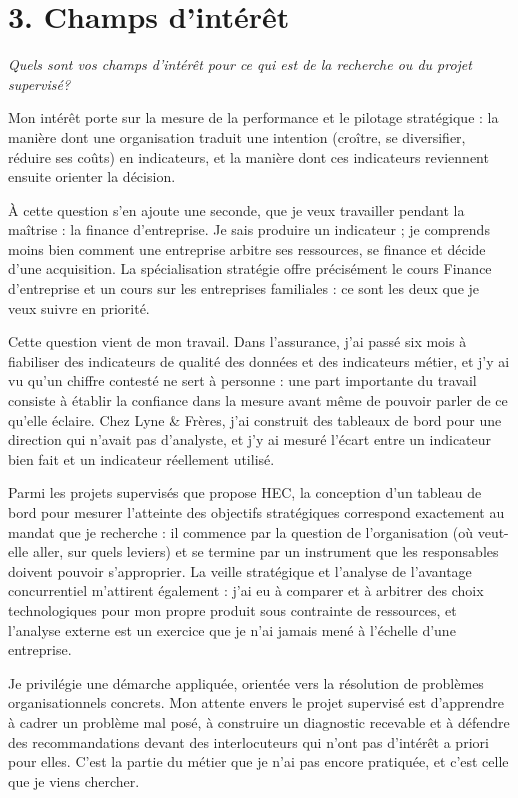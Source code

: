 \documentclass[12pt,a4paper]{article}
\begin{document}
\newpage
\section{3. Champs d'intérêt}
{\itshape\footnotesize Quels sont vos champs d'intérêt pour ce qui est de la recherche ou du projet supervisé?}\par
\vspace{0.35em}

Mon intérêt porte sur la mesure de la performance et le pilotage stratégique : la manière dont une organisation traduit une intention (croître, se diversifier, réduire ses coûts) en indicateurs, et la manière dont ces indicateurs reviennent ensuite orienter la décision.

À cette question s'en ajoute une seconde, que je veux travailler pendant la maîtrise : la finance d'entreprise. Je sais produire un indicateur ; je comprends moins bien comment une entreprise arbitre ses ressources, se finance et décide d'une acquisition. La spécialisation stratégie offre précisément le cours Finance d'entreprise et un cours sur les entreprises familiales : ce sont les deux que je veux suivre en priorité.

Cette question vient de mon travail. Dans l'assurance, j'ai passé six mois à fiabiliser des indicateurs de qualité des données et des indicateurs métier, et j'y ai vu qu'un chiffre contesté ne sert à personne : une part importante du travail consiste à établir la confiance dans la mesure avant même de pouvoir parler de ce qu'elle éclaire. Chez Lyne \& Frères, j'ai construit des tableaux de bord pour une direction qui n'avait pas d'analyste, et j'y ai mesuré l'écart entre un indicateur bien fait et un indicateur réellement utilisé.

Parmi les projets supervisés que propose HEC, la conception d'un tableau de bord pour mesurer l'atteinte des objectifs stratégiques correspond exactement au mandat que je recherche : il commence par la question de l'organisation (où veut-elle aller, sur quels leviers) et se termine par un instrument que les responsables doivent pouvoir s'approprier. La veille stratégique et l'analyse de l'avantage concurrentiel m'attirent également : j'ai eu à comparer et à arbitrer des choix technologiques pour mon propre produit sous contrainte de ressources, et l'analyse externe est un exercice que je n'ai jamais mené à l'échelle d'une entreprise.

Je privilégie une démarche appliquée, orientée vers la résolution de problèmes organisationnels concrets. Mon attente envers le projet supervisé est d'apprendre à cadrer un problème mal posé, à construire un diagnostic recevable et à défendre des recommandations devant des interlocuteurs qui n'ont pas d'intérêt a priori pour elles. C'est la partie du métier que je n'ai pas encore pratiquée, et c'est celle que je viens chercher.
\end{document}
